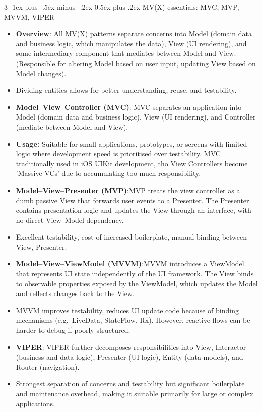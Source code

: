 \documentclass[a4paper, 9pt, landscape]{extarticle}
\makeatletter
\renewcommand{\subsubsection}{\@startsection{paragraph}{4}{0mm}%
                                {-1ex plus -.5ex minus -.2ex}%
                                {0.5ex plus .2ex}%
                                {\normalfont\footnotesize\bfseries}} %
\makeatother
\begin{document}
\begin{multicols*}{3}
\subsubsection{MV(X) essentials: MVC, MVP, MVVM, VIPER}
\begin{itemize}
  \item \textbf{Overview}: All MV(X) patterns separate concerns into Model (domain data and business logic, which manipulates the data), View (UI rendering), and some intermediary component that mediates between Model and View. (Responsible for altering Model based on user input, updating View based on Model changes).
  \item Dividing entities allows for better understanding, reuse, and testability.
  \item \textbf{Model--View--Controller (MVC)}: MVC separates an application into Model (domain data and business logic), View (UI rendering), and Controller (mediate between Model and View). 
  \item \textbf{Usage:} Suitable for small applications, prototypes, or screens with limited logic where development speed is prioritised over testability. MVC traditionally used in iOS UIKit development, tho View Controllers become 'Massive VCs' due to accumulating too much responsibility.
  \item \textbf{Model--View--Presenter (MVP)}:MVP treats the view controller as a dumb passive View that forwards user events to a Presenter. The Presenter contains presentation logic and updates the View through an interface, with no direct View--Model dependency.
  \item Excellent testability, cost of increased boilerplate, manual binding between View, Presenter.
  \item \textbf{Model--View--ViewModel (MVVM)}:MVVM introduces a ViewModel that represents UI state independently of the UI framework. The View binds to observable properties exposed by the ViewModel, which updates the Model and reflects changes back to the View.
  \item MVVM improves testability, reduces UI update code because of binding mechanisms (e.g.\ LiveData, StateFlow, Rx). However, reactive flows can be harder to debug if poorly structured.
  \item \textbf{VIPER}: VIPER further decomposes responsibilities into View, Interactor (business and data logic), Presenter (UI logic), Entity (data models), and Router (navigation).
  \item Strongest separation of concerns and testability but significant boilerplate and maintenance overhead, making it suitable primarily for large or complex applications.
\end{itemize}


\end{multicols*}
\end{document}
